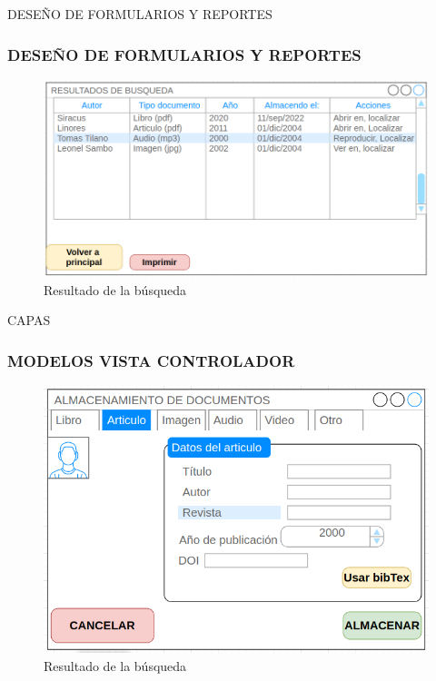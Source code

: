 \documentclass[article]{beamer}
\begin{document}
\begin{frame}{DESEÑO DE FORMULARIOS Y REPORTES}
\frametitle{DESEÑO DE FORMULARIOS Y REPORTES}
\begin{figure}[ht]
	\centering
	\includegraphics[scale=0.4]{images/resultadoBusqueda1}
	\caption{Resultado de la búsqueda}
\end{figure}
\end{frame}
\begin{frame}{CAPAS}
\frametitle{MODELOS VISTA CONTROLADOR}
\begin{figure}[ht]
	\centering
	\includegraphics[scale=0.4]{images/almacenamientoDato1}
	\caption{Resultado de la búsqueda}
\end{figure}
\end{frame}
\end{document}
